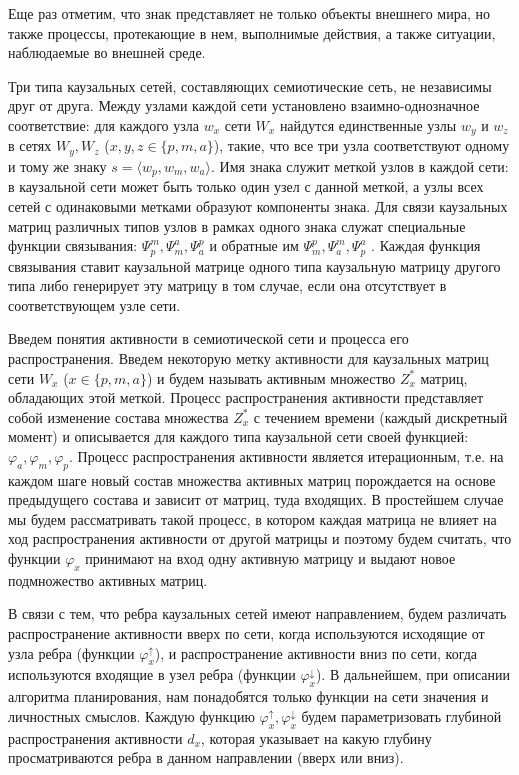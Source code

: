 \documentclass[12pt]{scrartcl}
\begin{document}
	Еще раз отметим, что знак представляет не только объекты внешнего мира, но также процессы, протекающие в нем, выполнимые действия, а также ситуации, наблюдаемые во внешней среде.

	Три типа каузальных сетей, составляющих семиотические сеть, не независимы друг от друга. Между узлами каждой сети установлено взаимно-однозначное соответствие: для каждого узла $w_x$ сети $W_x$ найдутся единственные узлы $w_y$ и $w_z$ в сетях $W_y, W_z$ ($x,y,z\in\{p,m,a\}$), такие, что все три узла соответствуют одному и тому же знаку $s=\langle w_p, w_m, w_a\rangle$. Имя знака служит меткой узлов в каждой сети: в каузальной сети может быть только один узел с данной меткой, а узлы всех сетей с одинаковыми метками образуют компоненты знака. Для связи каузальных матриц различных типов узлов в рамках одного знака служат специальные функции связывания: $\Psi_p^m, \Psi_m^a,\Psi_a^p$ и обратные им $\Psi_m^p,\Psi_a^m,\Psi_p^a$ \cite{Osipov2014c}. Каждая функция связывания ставит каузальной матрице одного типа каузальную матрицу другого типа либо генерирует эту матрицу в том случае, если она отсутствует в соответствующем узле сети.
	
	Введем понятия активности в семиотической сети и процесса его распространения. Введем некоторую метку активности для каузальных матриц сети $W_x$ ($x\in\{p,m,a\}$) и будем называть активным множество $Z_x^*$ матриц, обладающих этой меткой. Процесс распространения активности представляет собой изменение состава  множества $Z_x^*$ с течением времени (каждый дискретный момент) и описывается для каждого типа каузальной сети своей функцией: $\varphi_a, \varphi_m,\varphi_p$. Процесс распространения активности является итерационным, т.е. на каждом шаге новый состав множества активных матриц порождается на основе предыдущего состава и зависит от матриц, туда входящих. В простейшем случае мы будем рассматривать такой процесс, в котором каждая матрица не влияет на ход распространения активности от другой матрицы и поэтому будем считать, что функции $\varphi_x$ принимают на вход одну активную  матрицу и выдают новое подмножество активных матриц. 
	
	В связи с тем, что ребра каузальных сетей имеют направлением, будем различать распространение активности вверх по сети, когда используются исходящие от узла ребра (функции $\varphi_x^\uparrow$), и распространение активности вниз по сети, когда используются входящие в узел ребра (функции $\varphi_x^\downarrow$). В дальнейшем, при описании алгоритма планирования, нам понадобятся только функции на сети значения и личностных смыслов. Каждую функцию $\varphi_x^\uparrow,\varphi_x^\downarrow$ будем параметризовать глубиной распространения активности $d_x$, которая указывает на какую глубину просматриваются ребра в данном направлении (вверх или вниз).
		
\end{document}
